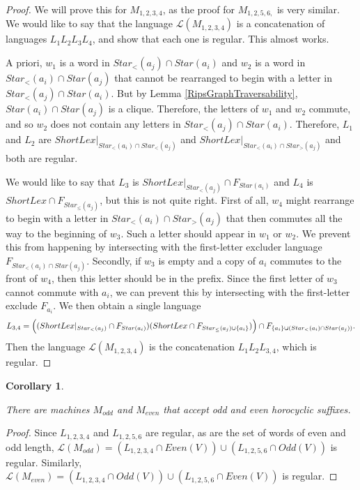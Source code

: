 \documentclass{amsart}
\newtheorem{corollary}[theorem]{Corollary}
\theoremstyle{definition}
\theoremstyle{remark}
\begin{document}
	\begin{proof}
		
		We will prove this for $M_{1,2,3,4}$, as the proof for $M_{1,2,5,6,}$ is very similar. We would like to say that the language $\mathscr{L}(M_{1,2,3,4})$ is a concatenation of languages $L_1L_2L_3L_4$, and show that each one is regular. This almost works.
		
		A priori, $w_1$ is a word in $Star_<(a_j)\cap Star(a_i)$ and $w_2$ is a word in $Star_<(a_i)\cap Star(a_j)$ that cannot be rearranged to begin with a letter in $Star_<(a_j)\cap Star(a_i)$. But by Lemma \ref{RipsGraphTraversability}, $Star(a_i)\cap Star(a_j)$ is a clique. Therefore, the letters of $w_1$ and $w_2$ commute, and so $w_2$ does not contain any letters in $Star_<(a_j)\cap Star(a_i)$. Therefore, $L_1$ and $L_2$ are $ShortLex|_{Star_<(a_i)\cap Star_<(a_j)}$ and $ShortLex|_{Star_<(a_i)\cap Star_>(a_j)}$ and both are regular.
		
		We would like to say that $L_3$ is $ShortLex|_{Star_<(a_j)}\cap F_{Star(a_i)}$ and $L_4$ is $ShortLex\cap F_{Star_\le(a_j)}$, but this is not quite right. First of all, $w_4$ might rearrange to begin with a letter in $Star_<(a_i)\cap Star_>(a_j)$ that then commutes all the way to the beginning of $w_3$. Such a letter should appear in $w_1$ or $w_2$. We prevent this from happening by intersecting with the first-letter excluder language $F_{Star_<(a_i)\cap Star(a_j)}$. Secondly, if $w_3$ is empty and a copy of $a_i$ commutes to the front of $w_4$, then this letter should be in the prefix. Since the first letter of $w_3$ cannot commute with $a_i$, we can prevent this by intersecting with the first-letter exclude $F_{a_i}$. We then obtain a single language 
		$$L_{3,4} = \Bigl((ShortLex|_{Star_<(a_j)}\cap F_{Star(a_i)})(ShortLex\cap F_{Star_\le(a_j)\cup \{a_i\}})\Bigr)\cap F_{\{a_i\}\cup(Star_<(a_i)\cap Star(a_j))}.$$
		Then the language $\mathscr{L}(M_{1,2,3,4})$ is the concatenation $L_1L_2L_{3,4}$, which is regular.
	\end{proof}
	
	\begin{corollary} \label{DivergenceGraphVertexFSM}
		
		There are machines $M_{odd}$ and $M_{even}$ that accept odd and even horocyclic suffixes.
		
	\end{corollary}
	
	\begin{proof}
		
		Since $L_{1,2,3,4}$ and $L_{1,2,5,6}$ are regular, as are the set of words of even and odd length, $\mathscr{L}(M_{odd})=(L_{1,2,3,4}\cap Even(V))\cup (L_{1,2,5,6}\cap Odd(V))$ is regular. Similarly, \newline $\mathscr{L}(M_{even})=(L_{1,2,3,4}\cap Odd(V))\cup (L_{1,2,5,6}\cap Even(V))$ is regular. 			
	\end{proof}
	
\end{document}
